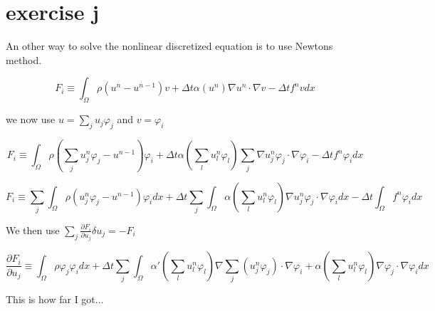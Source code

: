 \section{exercise j}

An other way to solve the nonlinear discretized equation is to use Newtons method.

\begin{equation}
 F_i \equiv \int_{\Omega} \rho (u^n - u^{n-1})v + \Delta t \alpha(u^n) \nabla u^n \cdot \nabla v -  \Delta t f^n v dx
\end{equation}

we now use $u = \sum_j u_j \varphi_j$ and $v = \varphi_i$

\begin{equation}
 F_i \equiv \int_{\Omega} \rho (\sum_j u_j^n \varphi_j - u^{n-1})\varphi_i + \Delta t \alpha(\sum_l u_l^n \varphi_l)  \sum_j \nabla u_j^n \varphi_j \cdot \nabla \varphi_i -  \Delta t f^n \varphi_i dx
\end{equation}

\begin{equation}
 F_i \equiv \sum_j \int_{\Omega} \rho ( u_j^n \varphi_j - u^{n-1})\varphi_i dx  + \Delta t \sum_j \int_{\Omega} \alpha(\sum_l u_l^n \varphi_l) \nabla u_j^n \varphi_j \cdot \nabla \varphi_i dx -  \Delta t \int_{\Omega} f^n \varphi_i dx
\end{equation}

We then use $ \sum_j \frac{\partial F_i}{\partial u_j} \delta u_j = - F_i$

\begin{equation}
 \frac{\partial F_i}{\partial u_j} \equiv \int_{\Omega} \rho \varphi_j \varphi_i dx  + \Delta t \sum_j \int_{\Omega} \alpha'(\sum_l u_l^n \varphi_l) \nabla \sum_j( u_j^n \varphi_j) \cdot \nabla \varphi_i + \alpha(\sum_l u_l^n \varphi_l) \nabla \varphi_j \cdot \nabla \varphi_i dx
\end{equation}

This is how far I got...